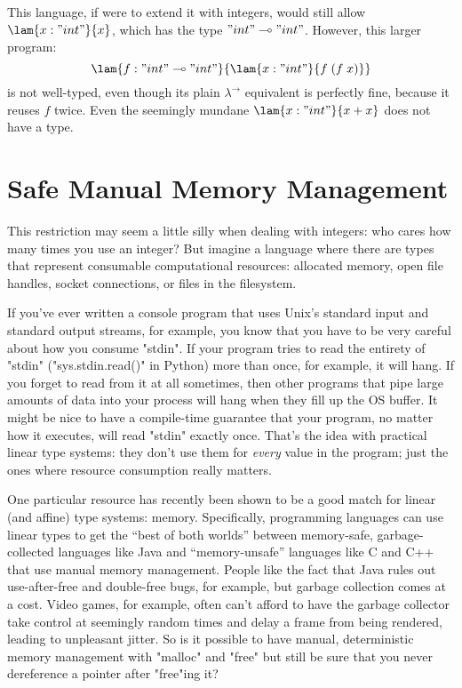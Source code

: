 This language, if were to extend it with integers, would still allow
$\lam{x : "int"}{x}$, which has the type $"int" \multimap "int"$.
However, this larger program:
%
$$
\lam{f : "int" \lolly "int"}{\lam{x : "int"}{f \; (f \; x)}}
$$
%
is not well-typed, even though its plain $\lambda^\to$ equivalent is perfectly
fine, because it reuses $f$ twice.
Even the seemingly mundane $\lam{x : "int"}{x + x}$ does not have a type.

\section{Safe Manual Memory Management}

This restriction may seem a little silly when dealing with integers: who cares
how many times you use an integer?
But imagine a language where there are types that represent consumable
computational resources: allocated memory, open file handles, socket
connections, or files in the filesystem.

If you've ever written a console program that uses Unix's standard input and
standard output streams, for example, you know that you have to be very
careful about how you consume "stdin".
If your program tries to read the entirety of "stdin" ("sys.stdin.read()" in
Python) more than once, for example, it will hang.
If you forget to read from it at all sometimes, then other programs that
pipe large amounts of data into your process will hang when they fill up the
OS buffer.
It might be nice to have a compile-time guarantee that your program, no matter
how it executes, will read "stdin" exactly once.
That's the idea with practical linear type systems: they don't use them for
\emph{every} value in the program; just the ones where resource consumption
really matters.

One particular resource has recently been shown to be a good match for linear
(and affine) type systems: memory.
Specifically, programming languages can use linear types to get the ``best of
both worlds'' between memory-safe, garbage-collected languages like Java and
``memory-unsafe'' languages like C and C++ that use manual memory management.
People like the fact that Java rules out use-after-free and double-free bugs,
for example, but garbage collection comes at a cost.
Video games, for example, often can't afford to have the garbage collector
take control at seemingly random times and delay a frame from being rendered,
leading to unpleasant jitter.
So is it possible to have manual, deterministic memory management with
"malloc" and "free" but still be sure that you never dereference a
pointer after "free"ing it?

